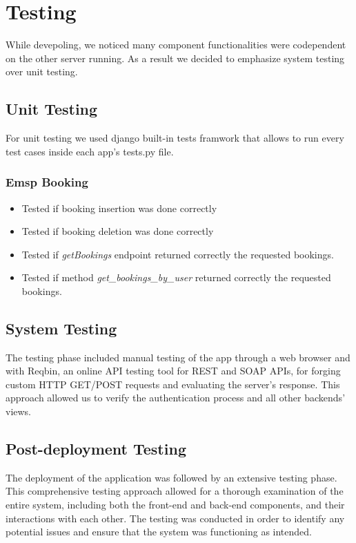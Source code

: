 \documentclass[table, 12pt]{article}
\begin{document}
\newpage
\section{Testing}
While devepoling, we noticed many component functionalities were codependent on the other server running. As a result we decided to emphasize system testing over
unit testing.

\subsection{Unit Testing}
For unit testing we used django built-in tests framwork that allows to run every test cases inside each app's tests.py file.
\subsubsection*{Emsp Booking}
\begin{itemize}
    \item Tested if booking insertion was done correctly
    \item Tested if booking deletion was done correctly
    \item Tested if \textit{getBookings} endpoint returned correctly the requested bookings.
    \item Tested if method \textit{get\_bookings\_by\_user} returned correctly the requested bookings.
\end{itemize}

\subsection{System Testing}
The testing phase included manual testing of the app through a web browser and with Reqbin, 
an online API testing tool for REST and SOAP APIs, for forging custom HTTP GET/POST requests and evaluating the server's response. 
This approach allowed us to verify the authentication process and all other backends' views. 

\subsection{Post-deployment Testing}
The deployment of the application was followed by an extensive testing phase. 
This comprehensive testing approach allowed for a thorough examination of the entire system, including both the front-end and back-end components,
 and their interactions with each other. 
The testing was conducted in order to identify any potential issues and ensure that the system was functioning as intended. 
\end{document}
